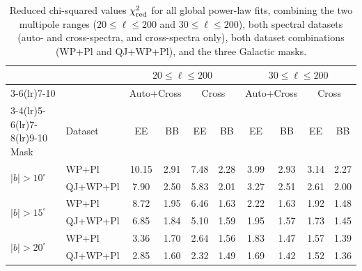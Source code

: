 \begin{table}[h]
\centering
\footnotesize
\setlength{\tabcolsep}{5pt}
\caption{Reduced chi-squared values $\chi^2_{\rm red}$ for all global power-law fits, combining the two multipole ranges ($20 \leq \ell \leq 200$ and $30 \leq \ell \leq 200$), both spectral datasets (auto- and cross-spectra, and cross-spectra only), both dataset combinations (WP+Pl and QJ+WP+Pl), and the three Galactic masks.}
\label{tab:chi2_all}
\begin{tabular}{llcccccccc}
\toprule
 & & \multicolumn{4}{c}{$20 \leq \ell \leq 200$} & \multicolumn{4}{c}{$30 \leq \ell \leq 200$} \\
\cmidrule(lr){3-6}\cmidrule(lr){7-10}
 & & \multicolumn{2}{c}{Auto+Cross} & \multicolumn{2}{c}{Cross} & \multicolumn{2}{c}{Auto+Cross} & \multicolumn{2}{c}{Cross} \\
\cmidrule(lr){3-4}\cmidrule(lr){5-6}\cmidrule(lr){7-8}\cmidrule(lr){9-10}
Mask & Dataset & EE & BB & EE & BB & EE & BB & EE & BB \\
\midrule
\multirow{2}{*}{$|b|>10^\circ$}
 & WP+Pl    & 10.15 & 2.91 & 7.48 & 2.28 & 3.99 & 2.93 & 3.14 & 2.27 \\
 & QJ+WP+Pl &  7.90 & 2.50 & 5.83 & 2.01 & 3.27 & 2.51 & 2.61 & 2.00 \\
\midrule
\multirow{2}{*}{$|b|>15^\circ$}
 & WP+Pl    &  8.72 & 1.95 & 6.46 & 1.63 & 2.22 & 1.63 & 1.92 & 1.48 \\
 & QJ+WP+Pl &  6.85 & 1.84 & 5.10 & 1.59 & 1.95 & 1.57 & 1.73 & 1.45 \\
\midrule
\multirow{2}{*}{$|b|>20^\circ$}
 & WP+Pl    &  3.36 & 1.70 & 2.64 & 1.56 & 1.83 & 1.47 & 1.57 & 1.39 \\
 & QJ+WP+Pl &  2.85 & 1.60 & 2.32 & 1.49 & 1.69 & 1.42 & 1.52 & 1.36 \\
\bottomrule
\end{tabular}
\end{table}
